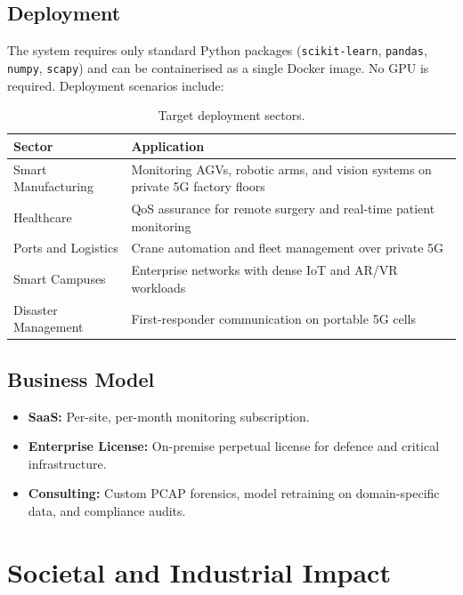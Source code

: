 \documentclass[11pt, a4paper]{article}
\begin{document}
\subsection{Deployment}

The system requires only standard Python packages (\texttt{scikit-learn}, \texttt{pandas}, \texttt{numpy}, \texttt{scapy}) and can be containerised as a single Docker image. No GPU is required. Deployment scenarios include:

\begin{table}[H]
\centering
\begin{tabular}{l p{9cm}}
\toprule
\textbf{Sector} & \textbf{Application} \\
\midrule
Smart Manufacturing & Monitoring AGVs, robotic arms, and vision systems on private 5G factory floors \\
Healthcare          & QoS assurance for remote surgery and real-time patient monitoring \\
Ports and Logistics & Crane automation and fleet management over private 5G \\
Smart Campuses      & Enterprise networks with dense IoT and AR/VR workloads \\
Disaster Management & First-responder communication on portable 5G cells \\
\bottomrule
\end{tabular}
\caption{Target deployment sectors.}
\label{tab:sectors}
\end{table}

\subsection{Business Model}

\begin{itemize}
    \item \textbf{SaaS:} Per-site, per-month monitoring subscription.
    \item \textbf{Enterprise License:} On-premise perpetual license for defence and critical infrastructure.
    \item \textbf{Consulting:} Custom PCAP forensics, model retraining on domain-specific data, and compliance audits.
\end{itemize}

\section{Societal and Industrial Impact}
\end{document}

